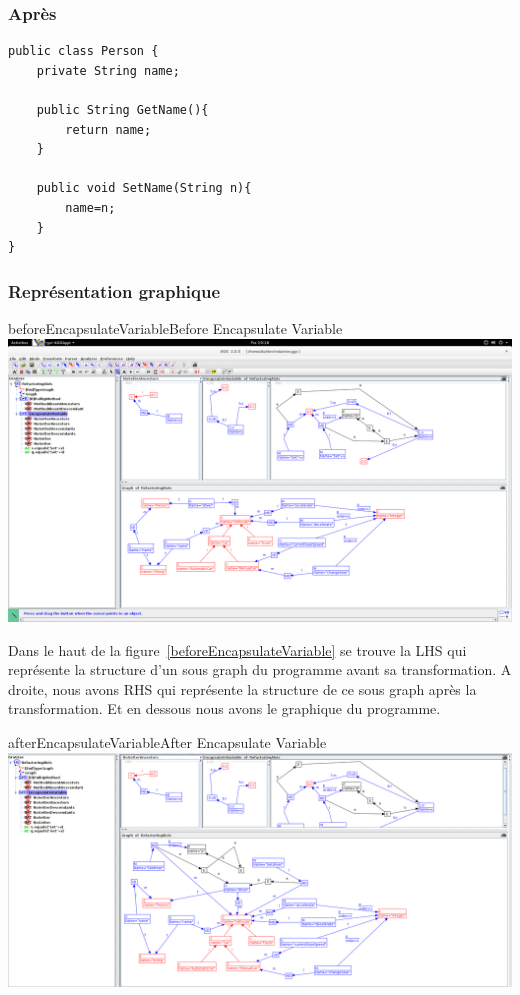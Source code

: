 \documentclass[a4paper, 12pt]{article}
\begin{document}
\subsubsection{Après}

\begin{lstlisting}[frame=single]
public class Person {
	private String name;
	
	public String GetName(){
		return name;
	}

	public void SetName(String n){
		name=n;
	}
}
\end{lstlisting}

\subsubsection{Représentation graphique}

\begin{myfig}{beforeEncapsulateVariable}{Before Encapsulate Variable}
\includegraphics[width=\textwidth]{beforeEncapsulateVariable.png}
\end{myfig}

Dans le haut de la figure~\ref{beforeEncapsulateVariable} se trouve la LHS qui représente la structure d'un sous graph du programme avant sa transformation. A droite, nous avons RHS qui représente la structure de ce sous graph après la transformation. Et en dessous nous avons le graphique du programme.

\begin{myfig}{afterEncapsulateVariable}{After Encapsulate Variable}
\includegraphics[width=\textwidth]{afterEncapsulateVariable.png}
\end{myfig}
\end{document}
